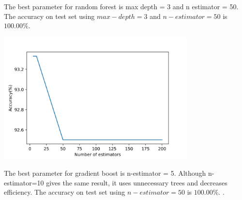 \documentclass[12pt]{article}
\begin{document}
The best parameter for random forest is max depth = 3 and n estimator = 50. The accuracy on test set using $max-depth=3$ and $n-estimator=50$ is $100.00\%$.
\begin{center}
    \includegraphics[width=10cm]{Q4c.png}
\end{center}
The best parameter for gradient boost is n-estimator = 5. Although n-estimator=10 gives the same result, it uses unnecessary trees and decreases efficiency. The accuracy on test set using $n-estimator=50$ is $100.00\%$.
\newpage
{}.
\end{document}
